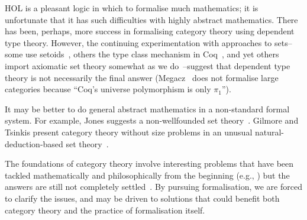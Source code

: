 \documentclass[twoside,titlepage,11pt]{article}
\begin{document}
HOL is a pleasant logic in which to formalise much mathematics; it is unfortunate that it has such difficulties with highly abstract mathematics.
There has been, perhaps, more success in formalising category theory using dependent type theory.
However, the continuing experimentation with approaches to sets--some use setoids~\cite{DBLP:conf/birthday/HuetS00,Carvalho,Wilander}, others the type class mechanism in Coq~\cite{DBLP:conf/mkm/CoquandS07,Sozeau,Megacz}, and yet others import axiomatic set theory somewhat as we do~\cite{Simpson04}--suggest that dependent type theory is not necessarily the final answer (Megacz~\cite{Megacz} does not formalise large categories because ``Coq's universe polymorphism is only $\pi_1$'').

It may be better to do general abstract mathematics in a non-standard formal system.
For example, Jones suggests a non-wellfounded set theory~\cite{RBJones18}.
Gilmore and Tsinkis present category theory without size problems in an unusual natural-deduction-based set theory~\cite{DBLP:journals/tcs/GilmoreT93}. 

The foundations of category theory involve interesting problems that have been tackled mathematically and philosophically from the beginning (e.g., \cite{Blass,springerlink:10.1007/BFb0059147}) but the answers are still not completely settled~\cite{Easwaran}.
By pursuing formalisation, we are forced to clarify the issues, and may be driven to solutions that could benefit both category theory and the practice of formalisation itself.


\end{document}
